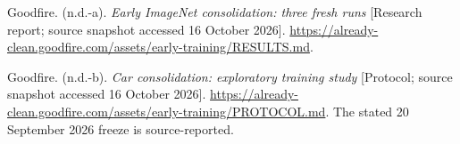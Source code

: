 \documentclass[
  british,
  11pt,
  a4paper,
]{article}
\begin{document}
Goodfire. (n.d.-a). \emph{Early ImageNet consolidation: three fresh
runs} {[}Research report; source snapshot accessed 16 October 2026{]}.
\url{https://already-clean.goodfire.com/assets/early-training/RESULTS.md}.

Goodfire. (n.d.-b). \emph{Car consolidation: exploratory training study}
{[}Protocol; source snapshot accessed 16 October 2026{]}.
\url{https://already-clean.goodfire.com/assets/early-training/PROTOCOL.md}.
The stated 20 September 2026 freeze is source-reported.
\end{document}
